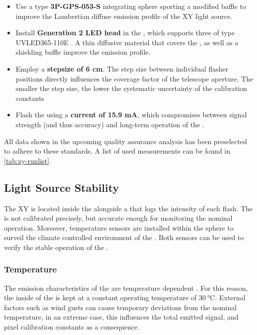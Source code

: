 \vspace{0.4cm}
\begin{itemize}
\item Use a type \textbf{3P-GPS-053-S} integrating sphere sporting a modified 
baffle to improve the Lambertian diffuse emission profile of the XY light 
source.

\item Install \textbf{Generation 2 LED head} in the \IS, which supports three
\LEDs of type UVLED365-110E \cite{alldatasheet.comUVLED365110EDownload}. A thin 
diffusive material that covers the \LEDs, as well as a shielding baffle improve
the emission profile.

\item Employ a \textbf{stepsize of 6 cm}. The step size between individual 
flasher positions directly influences the coverage factor of the telescope 
aperture. The smaller the step size, the lower the systematic uncertainty of the
calibration constants

\item Flash the \LED using a \textbf{current of 15.9 mA}, which compromises 
between \FD signal strength (and thus accuracy) and long-term operation of the 
\LED.

\end{itemize}
\vspace{0.4cm}

All data shown in the upcoming quality assurance analysis has been preselected
to adhere to these standards. A list of used measurements can be found in
\cref{tab:xy-runlist}.

\halflift
\subsection{Light Source Stability}

The XY \LED is located inside the \CLS alongside a \PD that logs the intensity 
of each \LED flash. The \PD is not calibrated precisely, but accurate enough for
monitoring the nominal \LED operation. Moreover, temperature sensors are 
installed within the sphere to surveil the climate controlled environment of the
\CLS. Both sensors can be used to verify the stable operation of the \CLS \LED.

\subsubsection{Temperature}
\label{sssec:xy-qa-temperature}

The emission characteristics of the \CLS \LED are temperature dependent 
\cite{alldatasheet.comUVLED365110EDownload}. For this reason, the inside of the
\IS is kept at a constant operating temperature of $\SI{30}{\celsius}$. External
factors such as wind gusts can cause temporary deviations from the nominal 
temperature, in an extreme case, this influences the total emitted signal, and
pixel calibration constants as a consequence.

